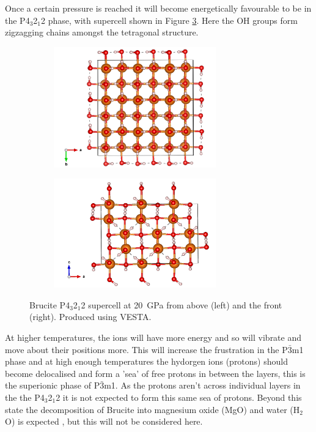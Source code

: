\documentclass[a4paper,12pt]{article}
\begin{document}
Once a certain pressure is reached it will become energetically favourable to be in the P4$_3$2$_1$2 phase, with supercell shown in Figure \ref{Fig4}. Here the OH groups form zigzagging chains amongst the tetragonal structure.
\begin{figure}[h!!!!]
	\centering
	\begin{subfigure}[t]{0.5\textwidth}
		\centering
		\includegraphics[width=7cm]{figures/p4_p200_supercell_above.png}
		\label{Fig4a}
	\end{subfigure}%
	\begin{subfigure}[t]{0.5\textwidth}
		\centering
		\includegraphics[width=7cm]{figures/p4_p200_supercell_side.png}
		\label{Fig4b}
	\end{subfigure}
	\caption{Brucite P4$_3$2$_1$2 supercell at \SI{20}{\GPa} from above (left) and the front (right). Produced using VESTA.}
	\label{Fig4}
\end{figure}

At higher temperatures, the ions will have more energy and so will vibrate and move about their positions more. This will increase the frustration in the P$\bar{3}$m1 phase and at high enough temperatures the hydorgen ions (protons) should become delocalised and form a 'sea' of free protons in between the layers, this is the superionic phase of P$\bar{3}$m1. As the protons aren't across individual layers in the the P4$_3$2$_1$2 it is not expected to form this same sea of protons. Beyond this state the decomposition of Brucite into magnesium oxide (MgO) and water (H$_2$O) is expected \cite{HermannKey}, but this will not be considered here.
\end{document}
